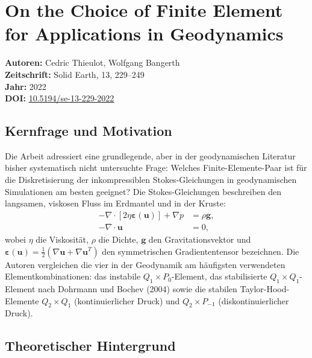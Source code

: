 \documentclass[a4paper,12pt]{article}
\begin{document}
\section*{On the Choice of Finite Element for Applications in Geodynamics}
\textbf{Autoren:} Cedric Thieulot, Wolfgang Bangerth \\
\textbf{Zeitschrift:} Solid Earth, 13, 229--249 \\
\textbf{Jahr:} 2022 \\
\textbf{DOI:} \href{https://doi.org/10.5194/se-13-229-2022}{10.5194/se-13-229-2022}

\subsection*{Kernfrage und Motivation}

Die Arbeit adressiert eine grundlegende, aber in der geodynamischen Literatur bisher systematisch nicht untersuchte Frage: Welches Finite-Elemente-Paar ist für die Diskretisierung der inkompressiblen Stokes-Gleichungen in geodynamischen Simulationen am besten geeignet? Die Stokes-Gleichungen beschreiben den langsamen, viskosen Fluss im Erdmantel und in der Kruste:
\begin{align}
    -\nabla \cdot [2\eta \boldsymbol{\varepsilon}(\mathbf{u})] + \nabla p &= \rho \mathbf{g}, \\
    -\nabla \cdot \mathbf{u} &= 0,
\end{align}
wobei $\eta$ die Viskosität, $\rho$ die Dichte, $\mathbf{g}$ den Gravitationsvektor und $\boldsymbol{\varepsilon}(\mathbf{u}) = \frac{1}{2}(\nabla \mathbf{u} + \nabla \mathbf{u}^T)$ den symmetrischen Gradiententensor bezeichnen. Die Autoren vergleichen die vier in der Geodynamik am häufigsten verwendeten Elementkombinationen: das instabile $Q_1 \times P_0$-Element, das stabilisierte $Q_1 \times Q_1$-Element nach Dohrmann und Bochev (2004) sowie die stabilen Taylor-Hood-Elemente $Q_2 \times Q_1$ (kontinuierlicher Druck) und $Q_2 \times P_{-1}$ (diskontinuierlicher Druck).

\subsection*{Theoretischer Hintergrund}
\end{document}
